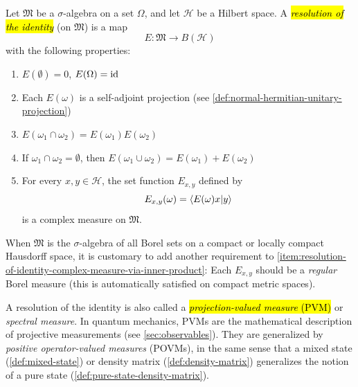 \begin{definition}\label{def:resolution-of-identity}
Let $\mathfrak{M}$ be a $\sigma$-algebra on a set $\Omega$, and let $\mathcal{H}$ be a Hilbert space.
A \hl{\emph{resolution of the identity}} (on $\mathfrak{M}$) is a map %
\[
E \colon \mathfrak{M} \to B(\mathcal{H})
\]
with the following properties:
\begin{enumerate}[label=(\alph*)]
\item $E(\emptyset) = 0$, $E(\Omega) = \operatorname{id}$ \label{item:Eemptyset-zero-EOmega-identity}
\item Each $E(\omega)$ is a self-adjoint projection (see \autoref{def:normal-hermitian-unitary-projection}) \label{item:each-Eomega-self-adjoint-projection}
\item $E(\omega_1 \cap \omega_2) = E(\omega_1) E(\omega_2)$ \label{item:Eomega1capomega2-is-Eomega1-times-Eomega2}
\item If $\omega_1 \cap \omega_2 = \emptyset$, then $E(\omega_1 \cup \omega_2) = E(\omega_1) + E(\omega_2)$ \label{item:if-disjoint-then-Eomega1cupomega2-is-sum}
\item For every $x,y \in \mathcal{H}$, the set function $E_{x,y}$ defined by
\begin{equation}\label{eq:complex-measure-via-inner-product}
E_{x,y}(\omega) = \braket{E(\omega)x | y}
\end{equation}
is a complex measure on $\mathfrak{M}$. \label{item:resolution-of-identity-complex-measure-via-inner-product}
\qedhere
\end{enumerate}
\end{definition}

When $\mathfrak{M}$ is the $\sigma$-algebra of all Borel sets on a compact or locally compact Hausdorff space, it is customary to add another requirement to \ref{item:resolution-of-identity-complex-measure-via-inner-product}:
Each $E_{x,y}$ should be a \emph{regular} Borel measure (this is automatically satisfied on compact metric spaces).

A resolution of the identity is also called a \hl{\emph{projection-valued measure} (PVM)} or \emph{spectral measure}. 
In quantum mechanics, PVMs are the mathematical description of projective measurements (see \autoref{sec:observables}).
They are generalized by \emph{positive operator-valued measures} (POVMs), in the same sense that a mixed state (\autoref{def:mixed-state}) or density matrix (\autoref{def:density-matrix}) generalizes the notion of a pure state (\autoref{def:pure-state-density-matrix}).



